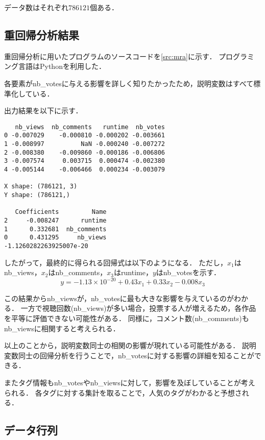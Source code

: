 \documentclass[uplatex]{jsarticle}
\begin{document}
データ数はそれぞれ$786121$個ある．

\subsection{重回帰分析結果}

重回帰分析に用いたプログラムのソースコードを\ref{src:mra}に示す．
プログラミング言語はPythonを利用した．

各要素がnb\_votesに与える影響を詳しく知りたかったため，説明変数はすべて標準化している．



出力結果を以下に示す．
\begin{screen}
\begin{verbatim}
   nb_views  nb_comments   runtime  nb_votes
0 -0.007029    -0.000810 -0.000202 -0.003661
1 -0.008997          NaN -0.000240 -0.007272
2 -0.008380    -0.009860 -0.000186 -0.006806
3 -0.007574     0.003715  0.000474 -0.002380
4 -0.005144    -0.006466  0.000234 -0.003079

X shape: (786121, 3)
Y shape: (786121,)

   Coefficients         Name
2     -0.008247      runtime
1      0.332681  nb_comments
0      0.431295     nb_views
-1.1260282263925007e-20
\end{verbatim}
\end{screen}

したがって，最終的に得られる回帰式は以下のようになる．
ただし，$x_1$はnb\_views，$x_2$はnb\_comments，$x_3$はruntime，$y$はnb\_votesを示す．
\begin{equation}
    y = -1.13\times 10^{-20} + 0.43 x_1 + 0.33 x_2 - 0.008 x_3
\end{equation}

この結果からnb\_viewsが，nb\_votesに最も大きな影響を与えているのがわかる．
一方で視聴回数(nb\_views)が多い場合，投票する人が増えるため，各作品を平等に評価できない可能性がある．
同様に，コメント数(nb\_comments)もnb\_viewsに相関すると考えられる．

以上のことから，説明変数同士の相関の影響が現れている可能性がある．
説明変数同士の回帰分析を行うことで，nb\_votesに対する影響の詳細を知ることができる．

またタグ情報もnb\_votesやnb\_viewsに対して，影響を及ぼしていることが考えられる．
各タグに対する集計を取ることで，人気のタグがわかると予想される．


\subsection{データ行列}
\end{document}
